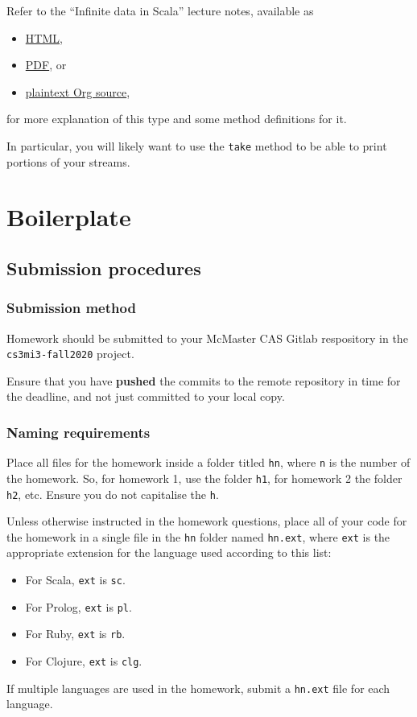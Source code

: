\documentclass[11pt]{article}
\begin{document}
Refer to the “Infinite data in Scala” lecture notes, available as
\begin{itemize}
\item \href{./../notes/live-coding/10-02-infinite-data-in-Scala.html}{HTML},
\item \href{./../notes/live-coding/10-02-infinite-data-in-Scala.pdf}{PDF}, or
\item \href{./../notes/live-coding/10-02-infinite-data-in-Scala.org}{plaintext Org source},
\end{itemize}
for more explanation of this type
and some method definitions for it.

In particular, you will likely want to use the \texttt{take} method
to be able to print portions of your streams.

\section*{Boilerplate}
\label{sec:org24bfd20}
\subsection*{Submission procedures}
\label{sec:org0fb309d}
\subsubsection*{Submission method}
\label{sec:orgc6f536a}

Homework should be submitted to your McMaster CAS Gitlab respository
in the \texttt{cs3mi3-fall2020} project.

Ensure that you have \textbf{pushed} the commits to the remote repository
in time for the deadline, and not just committed to your local copy.

\subsubsection*{Naming requirements}
\label{sec:org24208bb}

Place all files for the homework
inside a folder titled \texttt{hn}, where \texttt{n} is the number of the homework.
So, for homework 1, use the folder \texttt{h1}, for homework 2 the folder \texttt{h2}, etc.
Ensure you do not capitalise the \texttt{h}.

Unless otherwise instructed in the homework questions,
place all of your code for the homework
in a single file in the \texttt{hn} folder named \texttt{hn.ext},
where \texttt{ext} is the appropriate extension for the language used
according to this list:
\begin{itemize}
\item For Scala, \texttt{ext} is \texttt{sc}.
\item For Prolog, \texttt{ext} is \texttt{pl}.
\item For Ruby, \texttt{ext} is \texttt{rb}.
\item For Clojure, \texttt{ext} is \texttt{clg}.
\end{itemize}
If multiple languages are used in the homework,
submit a \texttt{hn.ext} file for each language.
\end{document}

